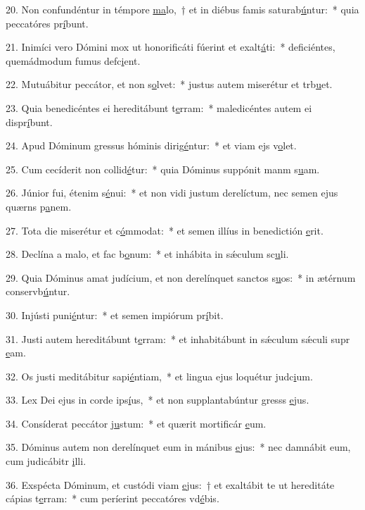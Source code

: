 20. Non confundéntur in témpore \uline{ma}lo,~† et in diébus famis saturab\uline{ú}ntur:~* quia peccatóres pr\uline{í}bunt.\par 
21. Inimíci vero Dómini mox ut honorificáti fúerint et exalt\uline{á}ti:~* deficiéntes, quemádmodum fumus defc\uline{i}ent.\par 
22. Mutuábitur peccátor, et non s\uline{o}lvet:~* justus autem miserétur et trb\uline{u}et.\par 
23. Quia benedicéntes ei hereditábunt t\uline{e}rram:~* maledicéntes autem ei dispr\uline{í}bunt.\par 
24. Apud Dóminum gressus hóminis dirig\uline{é}ntur:~* et viam ejs v\uline{o}let.\par 
25. Cum cecíderit non collid\uline{é}tur:~* quia Dóminus suppónit manm s\uline{u}am.\par 
26. Júnior fui, étenim s\uline{é}nui:~* et non vidi justum derelíctum, nec semen ejus quærns p\uline{a}nem.\par 
27. Tota die miserétur et c\uline{ó}mmodat:~* et semen illíus in benedictión \uline{e}rit.\par 
28. Declína a malo, et fac b\uline{o}num:~* et inhábita in sǽculum sc\uline{u}li.\par 
29. Quia Dóminus amat judícium, et non derelínquet sanctos s\uline{u}os:~* in ætérnum conservb\uline{ú}ntur.\par 
30. Injústi puni\uline{é}ntur:~* et semen impiórum pr\uline{í}bit.\par 
31. Justi autem hereditábunt t\uline{e}rram:~* et inhabitábunt in sǽculum sǽculi supr \uline{e}am.\par 
32. Os justi meditábitur sapi\uline{é}ntiam,~* et lingua ejus loquétur judc\uline{i}um.\par 
33. Lex Dei ejus in corde ips\uline{í}us,~* et non supplantabúntur gresss \uline{e}jus.\par 
34. Consíderat peccátor j\uline{u}stum:~* et quærit mortificár \uline{e}um.\par 
35. Dóminus autem non derelínquet eum in mánibus \uline{e}jus:~* nec damnábit eum, cum judicábitr \uline{i}lli.\par 
36. Exspécta Dóminum, et custódi viam \uline{e}jus:~† et exaltábit te ut hereditáte cápias t\uline{e}rram:~* cum períerint peccatóres vd\uline{é}bis.\par 
